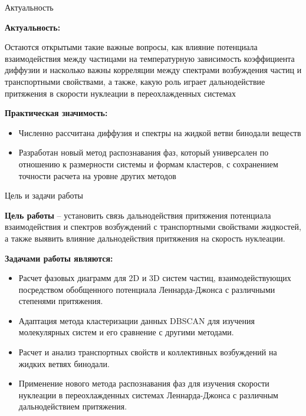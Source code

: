 \documentclass{beamer} %
\begin{document}
\begin{frame}{Актуальность}
  \footnotesize{

    \textbf{Актуальность:}

    Остаются открытыми такие важные вопросы, как влияние потенциала взаимодействия между частицами на температурную зависимость коэффициента диффузии и насколько важны корреляции между спектрами возбуждения частиц и транспортными свойствами, а также, какую роль играет дальнодействие притяжения в скорости нуклеации в переохлажденных системах

    \vspace{1cm}

    \textbf{Практическая значимость:}

    \begin{itemize}
      \item Численно рассчитана диффузия и спектры на жидкой ветви бинодали веществ
      \item Разработан новый метод распознавания фаз, который универсален по отношению к размерности системы и формам кластеров, с сохранением точности расчета на уровне других методов
    \end{itemize}
  }
\end{frame}




\begin{frame}{Цель и задачи работы}
  \footnotesize{

    \textbf{Цель работы} -- установить связь дальнодействия притяжения потенциала взаимодействия и спектров возбуждений с транспортными свойствами жидкостей, а также выявить влияние дальнодействия притяжения на скорость нуклеации.

    \vspace{0.5cm}

    \textbf{Задачами работы являются:}
    \begin{itemize}
      \item Расчет фазовых диаграмм для 2D и 3D систем частиц, взаимодействующих посредством обобщенного потенциала Леннарда-Джонса с различными степенями притяжения.
      \item Адаптация метода кластеризации данных DBSCAN для изучения молекулярных систем и его сравнение с другими методами.
      \item Расчет и анализ транспортных свойств и коллективных возбуждений на жидких ветвях бинодали.
      \item Применение нового метода распознавания фаз для изучения скорости нуклеации в переохлажденных системах Леннарда-Джонса с различным дальнодействием притяжения.
    \end{itemize}
  }
\end{frame}
\end{document}
